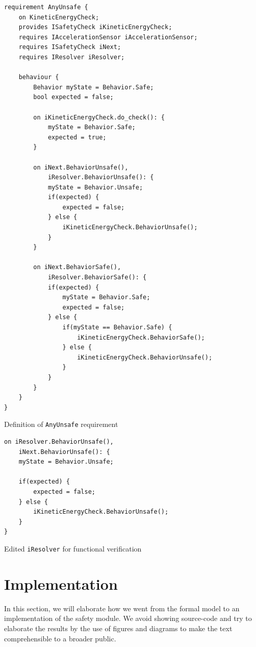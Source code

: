 \documentclass[12pt]{scrreprt}
\begin{document}
\begin{listing}
\begin{verbatim}
requirement AnyUnsafe {
	on KineticEnergyCheck;
	provides ISafetyCheck iKineticEnergyCheck;
	requires IAccelerationSensor iAccelerationSensor;
	requires ISafetyCheck iNext;
	requires IResolver iResolver;

    behaviour {
        Behavior myState = Behavior.Safe;
        bool expected = false;

        on iKineticEnergyCheck.do_check(): {
            myState = Behavior.Safe;
            expected = true;
        }

        on iNext.BehaviorUnsafe(),
            iResolver.BehaviorUnsafe(): {
            myState = Behavior.Unsafe;
            if(expected) {
                expected = false;
            } else {
                iKineticEnergyCheck.BehaviorUnsafe();
            }
        }

        on iNext.BehaviorSafe(),
            iResolver.BehaviorSafe(): {
            if(expected) {
                myState = Behavior.Safe;
                expected = false;
            } else {
                if(myState == Behavior.Safe) {
                    iKineticEnergyCheck.BehaviorSafe();
                } else {
                    iKineticEnergyCheck.BehaviorUnsafe();
                }
            }
        }
    }
}
\end{verbatim} 
\label{mfunctional_requirement}
\caption{Definition of \texttt{AnyUnsafe} requirement}
\end{listing}

\begin{listing}
\begin{verbatim}
on iResolver.BehaviorUnsafe(),
	iNext.BehaviorUnsafe(): {
	myState = Behavior.Unsafe;

	if(expected) {
	    expected = false;
	} else {
    	iKineticEnergyCheck.BehaviorUnsafe();
	}
}

\end{verbatim}

\label{modified_ke}
\caption{Edited \texttt{iResolver} for  functional verification}
\end{listing}


\newpage
\section{Implementation}
\label{Implementation}
In this section, we will elaborate how we went from the formal model to an implementation of the safety module. We avoid showing source-code and try to elaborate the results by the use of figures and diagrams to make the text comprehensible to a broader public.
\end{document}
